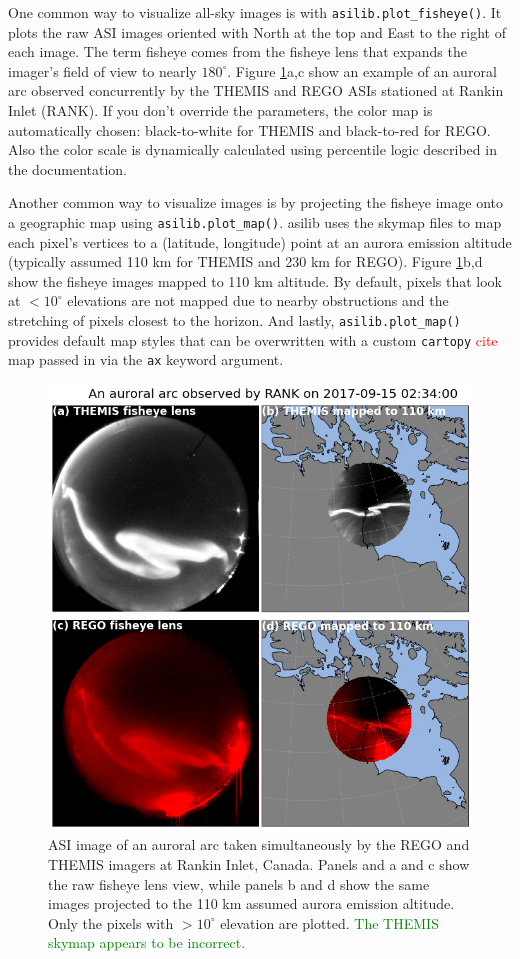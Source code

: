 \documentclass[draft]{agujournal2019}
\begin{document}
One common way to visualize all-sky images is with \verb|asilib.plot_fisheye()|. It plots the raw ASI images oriented with North at the top and East to the right of each image. The term fisheye comes from the fisheye lens that expands the imager's field of view to nearly $180^\circ$. Figure \ref{fig2}a,c show an example of an auroral arc observed concurrently by the THEMIS and REGO ASIs stationed at Rankin Inlet (RANK). If you don't override the parameters, the color map is automatically chosen: black-to-white for THEMIS and black-to-red for REGO. Also the color scale is dynamically calculated using percentile logic described in the documentation.

Another common way to visualize images is by projecting the fisheye image onto a geographic map using \verb|asilib.plot_map()|. asilib uses the skymap files to map each pixel's vertices to a (latitude, longitude) point at an aurora emission altitude (typically assumed 110 km for THEMIS and 230 km for REGO). Figure \ref{fig2}b,d show the fisheye images mapped to 110 km altitude. By default, pixels that look at $< 10^\circ$ elevations are not mapped due to nearby obstructions and the stretching of pixels closest to the horizon. And lastly, \verb|asilib.plot_map()| provides default map styles that can be overwritten with a custom \verb|cartopy| \textcolor{red}{cite} map passed in via the \verb|ax| keyword argument.

\begin{figure}
      \includegraphics[width=\textwidth]{figures/fig2.png}
      \caption{ASI image of an auroral arc taken simultaneously by the REGO and THEMIS imagers at Rankin Inlet, Canada. Panels and a and c show the raw fisheye lens view, while panels b and d show the same images projected to the 110 km assumed aurora emission altitude. Only the pixels with $>10^\circ$ elevation are plotted. \textcolor{green}{The THEMIS skymap appears to be incorrect.}}
      \label{fig2}
\end{figure}
\end{document}
